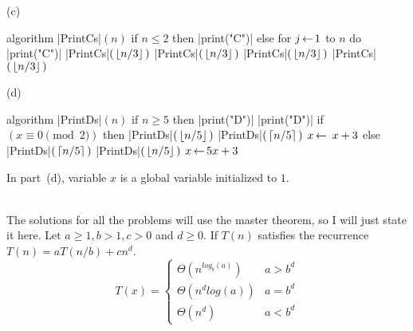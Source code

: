 \documentclass[11pt]{article}
\begin{document}
\begin{problem}
\medskip
\noindent
(c) 
\hspace{0.01in}
%
\begin{minipage}[t]{2.4in}
\strut\vspace*{- 2.5 \baselineskip}\newline 

\begin{program}
algorithm |PrintCs|$(n)$
   if $n\le 2$ then
      |print("C")|
   else
      for $j{\,\leftarrow\,} 1$ to $n$
         do |print("C")|
      |PrintCs|$(\,{\left\lfloor n/3\right\rfloor}\,)$
      |PrintCs|$(\,{\left\lfloor n/3\right\rfloor}\,)$
      |PrintCs|$(\,{\left\lfloor n/3\right\rfloor}\,)$
      |PrintCs|$(\,{\left\lfloor n/3\right\rfloor}\,)$
\end{program}
\end{minipage}
%
\hspace{0.4in}
(d) 
\hspace{0.01in}
%
\begin{minipage}[t]{2.4in}
\strut\vspace*{- 2.5 \baselineskip}\newline 

\begin{program}
algorithm |PrintDs|$(n)$  
   if $n\ge 5$ then
      |print("D")|
      |print("D")|
     if $(x \equiv 0 \pmod 2)$ then 
         |PrintDs|$(\,{\left\lfloor n/5\right\rfloor}\,)$
         |PrintDs|$(\,{\left\lceil n/5\right\rceil}\,)$
         $x{\,\leftarrow\,} \ x + 3$
      else
         |PrintDs|$(\,{\left\lceil n/5\right\rceil}\,)$
         |PrintDs|$(\,{\left\lfloor n/5\right\rfloor}\,)$
         $x{\,\leftarrow\,} 5x + 3$
\end{program}
\end{minipage}

\noindent
In part~(d), variable $x$ is a global variable initialized to $1$.
\end{problem}

\text{}\\
The solutions for all the problems will use the master theorem, so I will just state it here. Let $a \geq 1, b > 1, c > 0$ and $d \geq 0$. If $T(n)$ satisfies the recurrence $T(n) = aT(n/b) + cn^d$.
\[ T(x) = \begin{cases} 
   \Theta(n^{log_b{(a)}}) & a > b^d \\
   \Theta(n^dlog(a)) & a = b^d \\
   \Theta(n^d) & a < b^d 
\end{cases}
\]

\newpage
\end{document}
